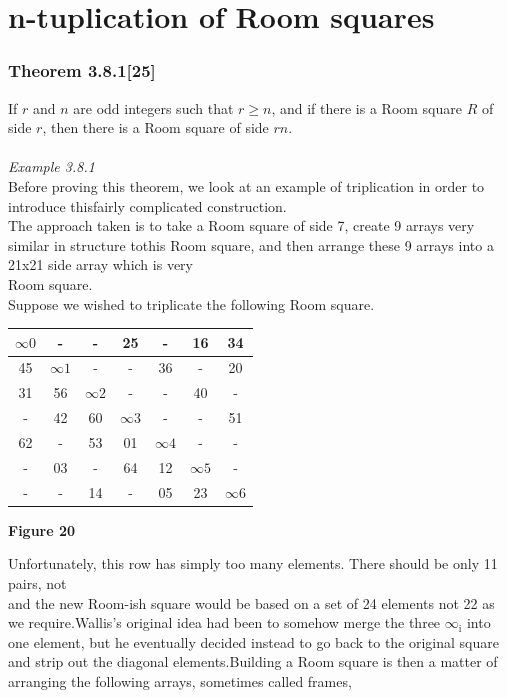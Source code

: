 \documentclass[
  12pt,
  a4paper]{book}
\begin{document}
\hypertarget{n-tuplication-of-room-squares}{%
\section{n-tuplication of Room
squares}\label{n-tuplication-of-room-squares}}

\hypertarget{theorem-3.8.125}{%
\subsubsection{Theorem 3.8.1{[}25{]}}\label{theorem-3.8.125}}

If \(r\) and \(n\) are odd integers such that \(r \geq n\), and if there
is a Room square \(R\) of side \(r\), then there is a Room square of
side \(rn\).\\
~\\
\emph{Example 3.8.1}\\
Before proving this theorem, we look at an example of triplication in
order to introduce thisfairly complicated construction.\\
The approach taken is to take a Room square of side 7, create 9 arrays
very similar in structure tothis Room square, and then arrange these 9
arrays into a 21x21 side array which is very\\
Room square.\\
Suppose we wished to triplicate the following Room square.

\begin{longtable}[]{@{}ccccccc@{}}
\toprule
\(\infty 0\) & - & - & 25 & - & 16 & 34\tabularnewline
\midrule
\endhead
45 & \(\infty 1\) & - & - & 36 & - & 20\tabularnewline
31 & 56 & \(\infty 2\) & - & - & 40 & -\tabularnewline
- & 42 & 60 & \(\infty 3\) & - & - & 51\tabularnewline
62 & - & 53 & 01 & \(\infty 4\) & - & -\tabularnewline
- & 03 & - & 64 & 12 & \(\infty 5\) & -\tabularnewline
- & - & 14 & - & 05 & 23 & \(\infty 6\)\tabularnewline
\bottomrule
\end{longtable}

\textbf{Figure 20}

Unfortunately, this row has simply too many elements. There should be
only 11 pairs, not\\
and the new Room-ish square would be based on a set of 24 elements not
22 as we require.Wallis's original idea had been to somehow merge the
three \(\infty _\mathrm{i}\) into one element, but he eventually decided
instead to go back to the original square and strip out the diagonal
elements.Building a Room square is then a matter of arranging the
following arrays, sometimes called frames,
\end{document}
